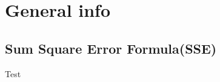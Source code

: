 \documentclass{article}
\begin{document}
\section{General info}
\subsection{Sum Square Error Formula(SSE)}
Test
\end{document}
